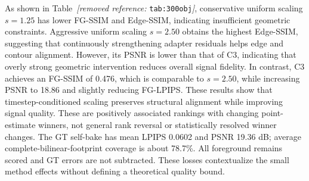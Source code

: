 \documentclass[times,twocolumn,final]{elsarticle}
\providecommand{\DIFadd}[1]{{\protect\color{blue} \sf #1}} %
\providecommand{\DIFdel}[1]{{\protect\color{red} \scriptsize #1}} %
\providecommand{\DIFaddbegin}{} %
\providecommand{\DIFaddend}{} %
\providecommand{\DIFdelend}{} %
\begin{document}

\DIFdel{As shown in Table~\textit{[removed reference: }\texttt{tab:300obj}\textit{]}, conservative uniform scaling $s = 1.25$ has lower FG-SSIM and Edge-SSIM, indicating insufficient geometric constraints. Aggressive uniform scaling $s = 2.50$ obtains the highest Edge-SSIM, suggesting that continuously strengthening adapter residuals helps edge and contour alignment. However, its PSNR is lower than that of C3, indicating that overly strong geometric intervention reduces overall signal fidelity. In contrast, C3 achieves an FG-SSIM of 0.476, which is comparable to $s = 2.50$, while increasing PSNR to 18.86 and slightly reducing FG-LPIPS. These results show that timestep-conditioned scaling preserves structural alignment while improving signal quality. }\DIFdelend \DIFaddbegin \DIFadd{These are positively associated rankings with changing point-estimate winners, not general rank reversal or statistically resolved winner changes. The GT self-bake has mean LPIPS 0.0602 and PSNR 19.36 dB; average complete-bilinear-footprint coverage is about 78.7\%. All foreground remains scored and GT errors are not subtracted. These losses contextualize the small method effects without defining a theoretical quality bound.
}\DIFaddend
\end{document}
